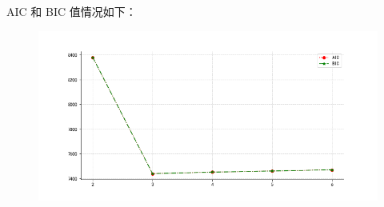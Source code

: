 \documentclass[fleqn,answers]{exam}
\begin{document}
AIC 和 BIC 值情况如下：
\begin{figure}[!ht]
    \centering
    \includegraphics[width=18cm]{./figures/3_metrics.png}
\end{figure}\\
\end{document}
